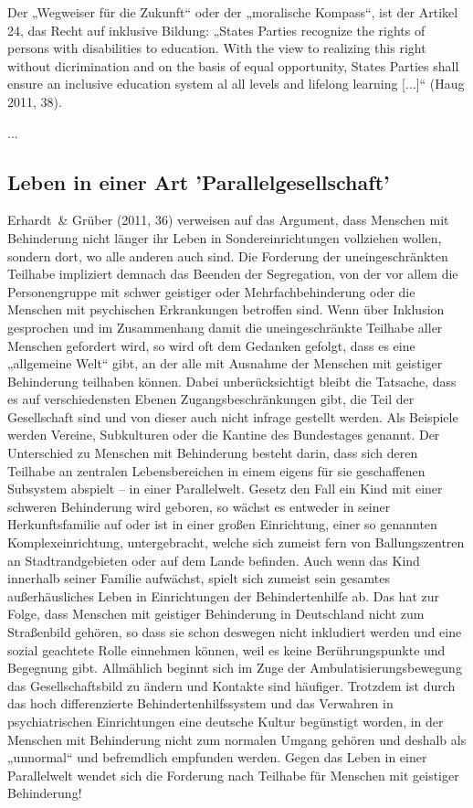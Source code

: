 Der „Wegweiser für die Zukunft“ oder der „moralische Kompass“, ist der Artikel 24, das Recht auf inklusive Bildung: „States Parties recognize the rights of persons with disabilities to education. With the view to realizing this right without dicrimination and on the basis of equal opportunity, States Parties shall ensure an inclusive education system al all levels and lifelong learning [...]“ (Haug 2011, 38).

...

\subsection{Leben in einer Art 'Parallelgesellschaft'}
Erhardt~\& Grüber (2011, 36) verweisen auf das Argument, dass Menschen mit Behinderung nicht länger ihr Leben in Sondereinrichtungen vollziehen wollen, sondern dort, wo alle anderen auch sind. Die Forderung der uneingeschränkten Teilhabe impliziert demnach das Beenden der Segregation, von der vor allem die Personengruppe mit schwer geistiger oder Mehrfachbehinderung oder die Menschen mit psychischen Erkrankungen betroffen sind. Wenn über Inklusion gesprochen und im Zusammenhang damit die uneingeschränkte Teilhabe aller Menschen gefordert wird, so wird oft dem Gedanken gefolgt, dass es eine „allgemeine Welt“ gibt, an der alle mit Ausnahme der Menschen mit geistiger Behinderung teilhaben können. Dabei unberücksichtigt bleibt die Tatsache, dass es auf verschiedensten Ebenen Zugangsbeschränkungen gibt, die Teil der Gesellschaft sind und von dieser auch nicht infrage gestellt werden. Als Beispiele werden Vereine, Subkulturen oder die Kantine des Bundestages genannt. Der Unterschied zu Menschen mit Behinderung besteht darin, dass sich deren Teilhabe an zentralen Lebensbereichen in einem eigens für sie geschaffenen Subsystem abspielt -- in einer Parallelwelt.
Gesetz den Fall ein Kind mit einer schweren Behinderung wird geboren, so wächst es entweder in seiner Herkunftsfamilie auf oder ist in einer großen Einrichtung, einer so genannten Komplexeinrichtung, untergebracht, welche sich zumeist fern von Ballungszentren an Stadtrandgebieten oder auf dem Lande befinden. Auch wenn das Kind  innerhalb seiner Familie aufwächst, spielt sich zumeist sein gesamtes außerhäusliches Leben in Einrichtungen der Behindertenhilfe ab. Das hat zur Folge, dass Menschen mit geistiger Behinderung in Deutschland nicht zum Straßenbild gehören, so dass sie schon deswegen nicht inkludiert werden und eine sozial geachtete Rolle einnehmen können, weil es keine Berührungspunkte und Begegnung gibt. Allmählich beginnt sich im Zuge der Ambulatisierungsbewegung das Gesellschaftsbild zu ändern und Kontakte sind häufiger. Trotzdem ist durch das hoch differenzierte Behindertenhilfssystem und das Verwahren in psychiatrischen Einrichtungen eine deutsche Kultur begünstigt worden, in der Menschen mit Behinderung nicht zum normalen Umgang gehören und deshalb als „unnormal“ und befremdlich empfunden werden. Gegen das Leben in einer Parallelwelt wendet sich die Forderung nach Teilhabe für Menschen mit geistiger Behinderung! 
